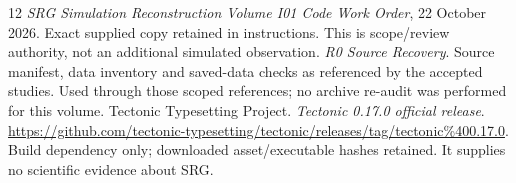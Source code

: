 \begin{thebibliography}{12}
\emph{SRG Simulation Reconstruction Volume I01 Code Work Order},
22 October 2026. Exact supplied copy retained in instructions.
This is scope/review authority, not an additional simulated observation.
\emph{R0 Source Recovery}. Source manifest, data inventory and
saved-data checks as referenced by the accepted studies.
Used through those scoped references; no archive re-audit was
performed for this volume.
Tectonic Typesetting Project.
\emph{Tectonic 0.17.0 official release}.
\url{https://github.com/tectonic-typesetting/tectonic/releases/tag/tectonic%400.17.0}.
Build dependency only; downloaded asset/executable hashes retained.
It supplies no scientific evidence about SRG.
\end{thebibliography}
